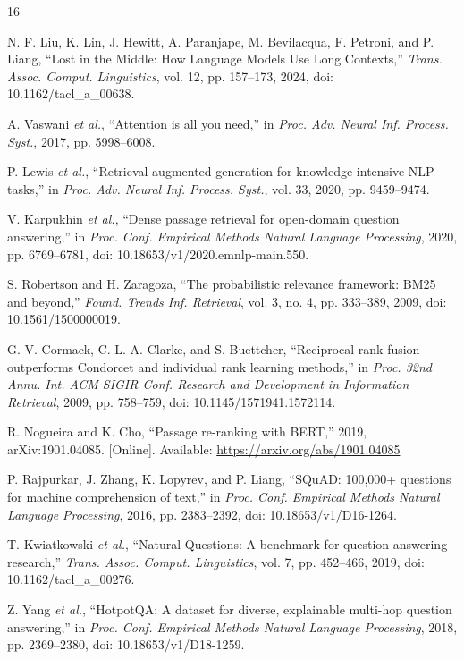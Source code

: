 \documentclass[conference]{IEEEtran}
\begin{document}
\begin{thebibliography}{16}

N. F. Liu, K. Lin, J. Hewitt, A. Paranjape, M. Bevilacqua, F. Petroni, and
P. Liang, ``Lost in the Middle: How Language Models Use Long Contexts,''
\emph{Trans. Assoc. Comput. Linguistics}, vol. 12, pp. 157--173, 2024,
doi: 10.1162/tacl\_a\_00638.

A. Vaswani \emph{et al.}, ``Attention is all you need,'' in
\emph{Proc. Adv. Neural Inf. Process. Syst.}, 2017, pp. 5998--6008.

P. Lewis \emph{et al.}, ``Retrieval-augmented generation for knowledge-intensive
NLP tasks,'' in \emph{Proc. Adv. Neural Inf. Process. Syst.}, vol. 33, 2020,
pp. 9459--9474.

V. Karpukhin \emph{et al.}, ``Dense passage retrieval for open-domain question
answering,'' in \emph{Proc. Conf. Empirical Methods Natural Language
Processing}, 2020, pp. 6769--6781, doi: 10.18653/v1/2020.emnlp-main.550.

S. Robertson and H. Zaragoza, ``The probabilistic relevance framework: BM25
and beyond,'' \emph{Found. Trends Inf. Retrieval}, vol. 3, no. 4, pp. 333--389,
2009, doi: 10.1561/1500000019.

G. V. Cormack, C. L. A. Clarke, and S. Buettcher, ``Reciprocal rank fusion
outperforms Condorcet and individual rank learning methods,'' in
\emph{Proc. 32nd Annu. Int. ACM SIGIR Conf. Research and Development in
Information Retrieval}, 2009, pp. 758--759, doi: 10.1145/1571941.1572114.

R. Nogueira and K. Cho, ``Passage re-ranking with BERT,'' 2019,
arXiv:1901.04085. [Online]. Available: \url{https://arxiv.org/abs/1901.04085}

P. Rajpurkar, J. Zhang, K. Lopyrev, and P. Liang, ``SQuAD: 100,000+ questions
for machine comprehension of text,'' in \emph{Proc. Conf. Empirical Methods
Natural Language Processing}, 2016, pp. 2383--2392,
doi: 10.18653/v1/D16-1264.

T. Kwiatkowski \emph{et al.}, ``Natural Questions: A benchmark for question
answering research,'' \emph{Trans. Assoc. Comput. Linguistics}, vol. 7,
pp. 452--466, 2019, doi: 10.1162/tacl\_a\_00276.

Z. Yang \emph{et al.}, ``HotpotQA: A dataset for diverse, explainable
multi-hop question answering,'' in \emph{Proc. Conf. Empirical Methods
Natural Language Processing}, 2018, pp. 2369--2380,
doi: 10.18653/v1/D18-1259.


\end{thebibliography}
\end{document}
